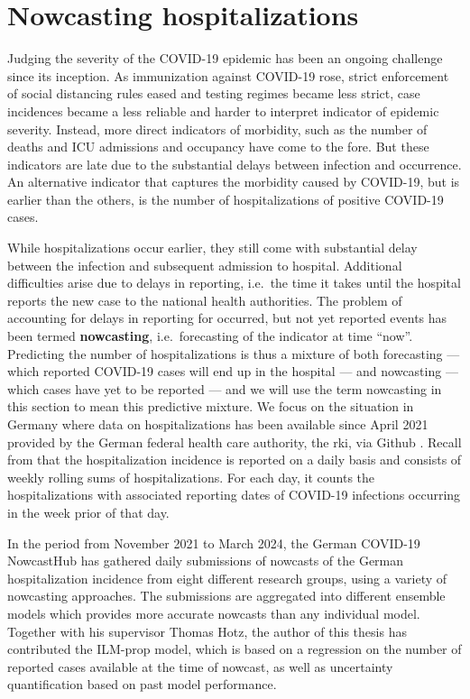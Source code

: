 \section{Nowcasting hospitalizations}%
\label{sec:nowcasting_hospitalizations}
Judging the severity of the COVID-19 epidemic has been an ongoing challenge since its inception. As immunization against COVID-19 rose, strict enforcement of social distancing rules eased and testing regimes became less strict, case incidences became a less reliable and harder to interpret indicator of epidemic severity. Instead, more direct indicators of morbidity, such as the number of deaths and ICU admissions and occupancy have come to the fore. But these indicators are late due to the substantial delays between infection and occurrence. An alternative indicator that captures the morbidity caused by COVID-19, but is earlier than the others, is the number of hospitalizations of positive COVID-19 cases.

While hospitalizations occur earlier, they still come with substantial delay between the infection and subsequent admission to hospital. Additional difficulties arise due to delays in reporting, i.e.~the time it takes until the hospital reports the new case to the national health authorities. The problem of accounting for delays in reporting for occurred, but not yet reported events has been termed \textbf{nowcasting}, i.e.~forecasting of the indicator at time ``now''. Predicting the number of hospitalizations is thus a mixture of both forecasting --- which reported COVID-19 cases will end up in the hospital --- and nowcasting --- which cases have yet to be reported --- and we will use the term nowcasting in this section to mean this predictive mixture. We focus on the situation in Germany where data on hospitalizations has been available since April 2021 provided by the German federal health care authority, the \gls{rki}, via Github \citep{RobertKoch-Institut2021COVID19Hospitalisierungen}. Recall from  that the hospitalization incidence is reported on a daily basis and consists of weekly rolling sums of hospitalizations. For each day, it counts the hospitalizations with associated reporting dates of COVID-19 infections occurring in the week prior of that day. 

In the period from November 2021 to March 2024, the German COVID-19 NowcastHub \citep{Wolffram2023Collaborative} has gathered daily submissions of nowcasts of the German hospitalization incidence from eight different research groups, using a variety of nowcasting approaches. The submissions are aggregated into different ensemble models which provides more accurate nowcasts than any individual model. Together with his supervisor Thomas Hotz, the author of this thesis has contributed the \glqq{}ILM-prop\grqq{} model, which is based on a regression on the number of reported cases available at the time of nowcast, as well as uncertainty quantification based on past model performance. 

